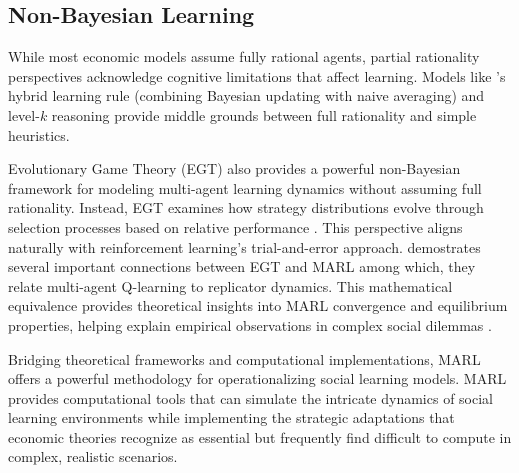 \documentclass[a4paper,12pt]{report}
\begin{document}
\subsection{Non-Bayesian Learning}

While most economic models assume fully rational agents, partial rationality perspectives acknowledge cognitive limitations that affect learning. Models like \citet{jadbabaie2012non}'s hybrid learning rule (combining Bayesian updating with naive averaging) and level-$k$ reasoning \citep{stahl1994experimental, crawford2007level} provide middle grounds between full rationality and simple heuristics.

Evolutionary Game Theory (EGT) also provides a powerful non-Bayesian framework for modeling multi-agent learning dynamics without assuming full rationality. Instead, EGT examines how strategy distributions evolve through selection processes based on relative performance \citep{weibull1997evolutionary}. This perspective aligns naturally with reinforcement learning's trial-and-error approach. \citet{tuyls2004evolutionary} demostrates several important connections between EGT and MARL among which, they relate multi-agent Q-learning to replicator dynamics. This mathematical equivalence provides theoretical insights into MARL convergence and equilibrium properties, helping explain empirical observations in complex social dilemmas \citep{leibo2017multi}.

Bridging theoretical frameworks and computational implementations, MARL offers a powerful methodology for operationalizing social learning models. MARL provides computational tools that can simulate the intricate dynamics of social learning environments while implementing the strategic adaptations that economic theories recognize as essential but frequently find difficult to compute in complex, realistic scenarios.
\end{document}
